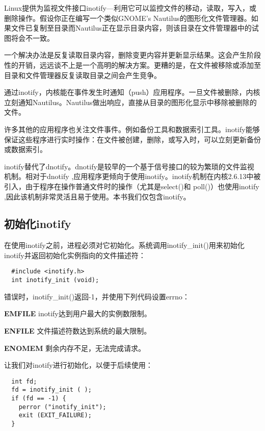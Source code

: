 Linux提供为监视文件接口inotify—利用它可以监控文件的移动，读取，写入，或删除操作。假设你正在编写一个类似GNOME’s Nautilus的图形化文件管理器。如果文件已复制至目录而Nautilus正在显示目录内容，则该目录在文件管理器中的试图将会不一致。

一个解决办法是反复读取目录内容，删除变更内容并更新显示结果。这会产生阶段性的开销，远远谈不上是一个高明的解决方案。更糟的是，在文件被移除或添加至目录和文件管理器反复读取目录之间会产生竞争。

通过inotify，内核能在事件发生时通知（push）应用程序。一旦文件被删除，内核立刻通知Nautilus。Nautilus做出响应，直接从目录的图形化显示中移除被删除的文件。

许多其他的应用程序也关注文件事件。例如备份工具和数据索引工具。inotify能够保证这些程序进行实时操作：在文件被创建，删除，或写入时，可以立刻更新备份或数据索引。

inotify替代了dnotify。dnotify是较早的一个基于信号接口的较为繁琐的文件监视机制。相对于dnotify ,应用程序更倾向于使用inotify。inotify机制在内核2.6.13中被引入，由于程序在操作普通文件时的操作（尤其是select()和 poll()）也使用inotify ,因此该机制非常灵活且易于使用。本书我们仅包含inotify。 

\subsection{初始化inotify}

在使用inotify之前，进程必须对它初始化。系统调用inotify\_init()用来初始化inotify并返回初始化实例指向的文件描述符：

\begin{lstlisting}
  #include <inotify.h>
  int inotify_init (void);
\end{lstlisting}

错误时，inotify\_init()返回-1，并使用下列代码设置errno：

\begin{eqlist*}
\item[\textbf{EMFILE}] inotify达到用户最大的实例数限制。
\item[\textbf{ENFILE}] 文件描述符数达到系统的最大限制。
\item[\textbf{ENOMEM}] 剩余内存不足，无法完成请求。
\end{eqlist*}

让我们对inotify进行初始化，以便于后续使用：

\begin{lstlisting}
  int fd;
  fd = inotify_init ( );
  if (fd == -1) {
    perror ("inotify_init");
    exit (EXIT_FAILURE);
  }
\end{lstlisting}

